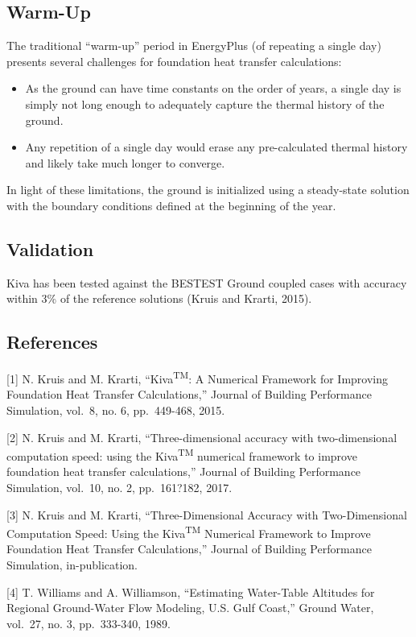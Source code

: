 \subsection{Warm-Up}\label{warm-up}

The traditional ``warm-up'' period in EnergyPlus (of repeating a single
day) presents several challenges for foundation heat transfer
calculations:

\begin{itemize}
\tightlist
\item
  As the ground can have time constants on the order of years, a single
  day is simply not long enough to adequately capture the thermal
  history of the ground.
\item
  Any repetition of a single day would erase any pre-calculated thermal
  history and likely take much longer to converge.
\end{itemize}

In light of these limitations, the ground is initialized using a
steady-state solution with the boundary conditions defined at the
beginning of the year.

\subsection{Validation}\label{validation}

Kiva has been tested against the BESTEST Ground coupled cases with
accuracy within 3\% of the reference solutions (Kruis and Krarti, 2015).

\subsection{References}\label{references}

{[}1{]} N. Kruis and M. Krarti, ``Kiva\textsuperscript{TM}: A Numerical
Framework for Improving Foundation Heat Transfer Calculations,'' Journal
of Building Performance Simulation, vol.~8, no. 6, pp.~449-468, 2015.

{[}2{]} N. Kruis and M. Krarti, ``Three-dimensional accuracy with
two-dimensional computation speed: using the Kiva\textsuperscript{TM}
numerical framework to improve foundation heat transfer calculations,''
Journal of Building Performance Simulation, vol.~10, no. 2, pp.~161?182,
2017.

{[}3{]} N. Kruis and M. Krarti, ``Three-Dimensional Accuracy with
Two-Dimensional Computation Speed: Using the Kiva\textsuperscript{TM}
Numerical Framework to Improve Foundation Heat Transfer Calculations,''
Journal of Building Performance Simulation, in-publication.

{[}4{]} T. Williams and A. Williamson, ``Estimating Water-Table
Altitudes for Regional Ground-Water Flow Modeling, U.S. Gulf Coast,''
Ground Water, vol.~27, no. 3, pp.~333-340, 1989.

